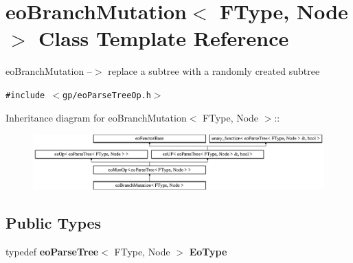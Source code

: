\section{eo\-Branch\-Mutation$<$ FType, Node $>$ Class Template Reference}
\label{classeo_branch_mutation}
eo\-Branch\-Mutation --$>$ replace a subtree with a randomly created subtree  


{\tt \#include $<$gp/eo\-Parse\-Tree\-Op.h$>$}

Inheritance diagram for eo\-Branch\-Mutation$<$ FType, Node $>$::\begin{figure}[H]
\begin{center}
\leavevmode
\includegraphics[height=2.14559cm]{classeo_branch_mutation}
\end{center}
\end{figure}
\subsection*{Public Types}
\begin{CompactItemize}
\item 
typedef {\bf eo\-Parse\-Tree}$<$ FType, Node $>$ {\bf Eo\-Type}\label{classeo_branch_mutation_w0}

\end{CompactItemize}
